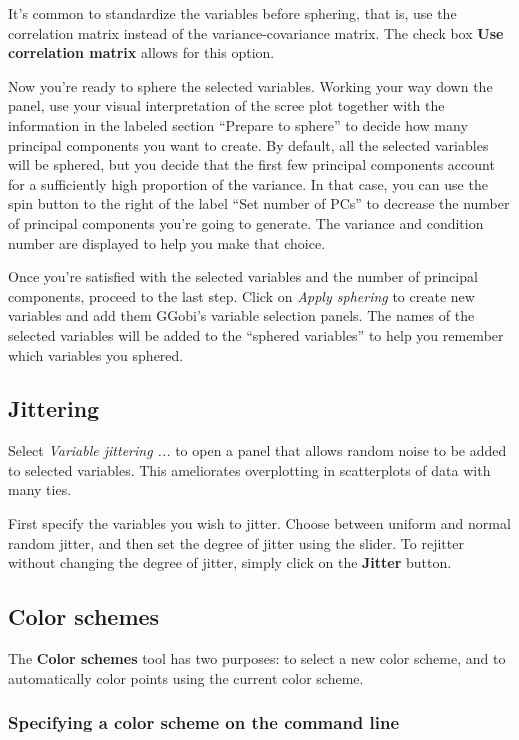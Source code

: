 \documentclass[11pt]{article}
\begin{document}
It's common to standardize the variables before sphering, that is, use
the correlation matrix instead of the variance-covariance matrix. The
check box {\bf Use correlation matrix} allows for this option.

Now you're ready to sphere the selected variables.  Working your way down
the panel, use your visual interpretation of the scree plot together
with the information in the labeled section ``Prepare to sphere'' to
decide how many principal components you want to create.  By default,
all the selected variables will be sphered, but you decide that the first
few principal components account for a sufficiently high proportion of
the variance.  In that case, you can use the spin button to the right
of the label ``Set number of PCs'' to decrease the number of principal
components you're going to generate.  The variance and condition number
are displayed to help you make that choice.

Once you're satisfied with the selected variables and the number of
principal components, proceed to the last step.  Click on {\em Apply
sphering} to create new variables and add them GGobi's variable selection
panels.  The names of the selected variables will be added to the
``sphered variables'' to help you remember which variables you sphered.

\subsection{Jittering}

Select {\em Variable jittering ...} to open a panel that allows
random noise to be added to selected variables.  This ameliorates
overplotting in scatterplots of data with many ties.

First specify the variables you wish to jitter.  Choose between uniform
and normal random jitter, and then set the degree of jitter using the
slider.  To rejitter without changing the degree of jitter, simply click
on the {\bf Jitter} button.

\subsection{Color schemes}
\label{slbl:ColorSchemes}

The {\bf Color schemes} tool has two purposes: to select a
new color scheme, and to automatically color points
using the current color scheme.

\subsubsection{Specifying a color scheme on the command line}
\end{document}
